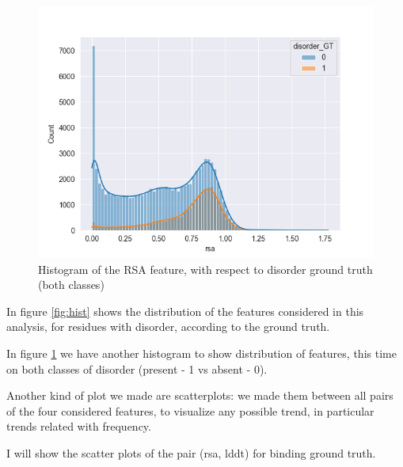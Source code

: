 \begin{figure}[h!]
    \centering
    \includegraphics{res/analysis/plots/hue-histplot_rsa.png}
    \caption{Histogram of the RSA feature, with respect to disorder ground truth (both classes)}
    \label{fig:histRsa}
\end{figure}

In figure \ref{fig:hist} shows the distribution of the features considered in this analysis, for residues with disorder, according to the ground truth.

In figure \ref{fig:histRsa} we have another histogram to show distribution of features, this time on both classes of disorder (present - 1 vs absent - 0).

Another kind of plot we made are scatterplots: we made them between all pairs of the four considered features, to visualize any possible trend, in particular trends related with frequency.

I will show the scatter plots of the pair (rsa, lddt) for binding ground truth.


